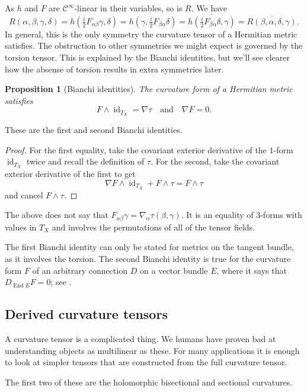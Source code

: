 \documentclass[10pt,a4paper]{article}
\newtheorem{prop}[theo]{Proposition}
\newtheorem*{proof}{Proof}
\newcommand{\cc}[1]{\mathcal{#1}}
\DeclareMathOperator{\End}{End}
\DeclareMathOperator{\id}{id}
\begin{document}
As $h$ and $F$ are $\cc C^\infty$-linear in their variables, so is $R$. We have
$$
R(\alpha,\beta,\gamma,\delta)
= h(\tfrac i2 F_{\alpha\beta}\gamma, \delta)
= h(\gamma, \tfrac i2 F_{\beta\alpha}\delta)
= \overline{h(\tfrac i2 F_{\beta\alpha}\delta, \gamma)}
= \overline{R(\beta,\alpha,\delta,\gamma)}.
$$
In general, this is the only symmetry the curvature tensor of a Hermitian metric satisfies. The obstruction to other symmetries we might expect is governed by the torsion tensor. This is explained by the Bianchi identities, but we'll see clearer how the absense of torsion results in extra symmetries later.


\begin{prop}[Bianchi identities]
The curvature form of a Hermitian metric satisfies
$$
F \wedge \id_{T_X} = \nabla \tau
\quad\text{and}\quad
\nabla F = 0.
$$
\end{prop}

These are the first and second Bianchi identities.

\begin{proof}
  For the first equality, take the covariant exterior derivative of the $1$-form $\id_{T_X}$ twice and recall the definition of $\tau$. For the second, take the covariant exterior derivative of the first to get
$$
\nabla F \wedge \id_{T_X} + F \wedge \tau = F \wedge \tau
$$
and cancel $F \wedge \tau$.
\end{proof}


The above does not say that $F_{\alpha\beta}\gamma = \nabla_\alpha \tau(\beta,\gamma)$. It is an equality of $3$-forms with values in $T_X$ and involves the permutations of all of the tensor fields.

The first Bianchi identity can only be stated for metrics on the tangent bundle, as it involves the torsion. The second Bianchi identity is true for the curvature form $F$ of an arbitrary connection $D$ on a vector bundle $E$, where it says that $D_{\End E} F = 0$; see .


\subsection{Derived curvature tensors}


A curvature tensor is a complicated thing. We humans have proven bad at understanding objects as multilinear as these. For many applications it is enough to look at simpler tensors that are constructed from the full curvature tensor.

The first two of these are the holomorphic bisectional and sectional curvatures.
\end{document}
